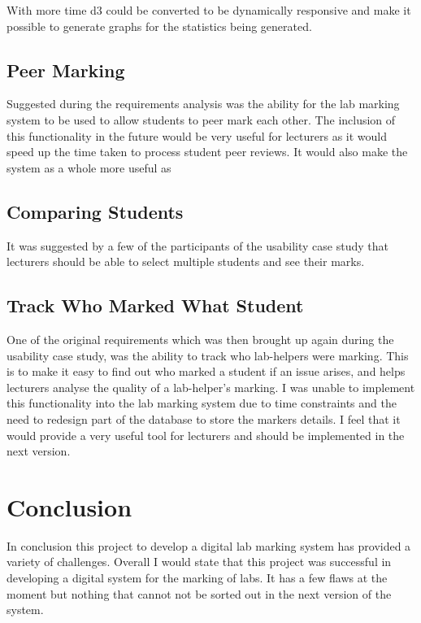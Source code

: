\documentclass[11pt]{report}
\begin{document}
With more time d3 could be converted to be dynamically responsive and make it possible to generate graphs for the statistics being generated.

\subsection{Peer Marking}

Suggested during the requirements analysis was the ability for the lab marking system to be used to allow students to peer mark each other. The inclusion of this functionality in the future would be very useful for lecturers as it would speed up the time taken to process student peer reviews. It would also make the system as a whole more useful as 

\subsection{Comparing Students}

It was suggested by a few of the participants of the usability case study that lecturers should be able to select multiple students and see their marks.

\subsection{Track Who Marked What Student}

One of the original requirements which was then brought up again during the usability case study, was the ability to track who lab-helpers were marking. This is to make it easy to find out who marked a student if an issue arises, and helps lecturers analyse the quality of a lab-helper's marking. 
I was unable to implement this functionality into the lab marking system due to time constraints and the need to redesign part of the database to store the markers details. I feel that it would provide a very useful tool for lecturers and should be implemented in the next version.


\section{Conclusion}

In conclusion this project to develop a digital lab marking system has provided a variety of challenges.
Overall I would state that this project was successful in developing a digital system for the marking of labs. It has a few flaws at the moment but nothing that cannot not be sorted out in the next version of the system.
\end{document}
